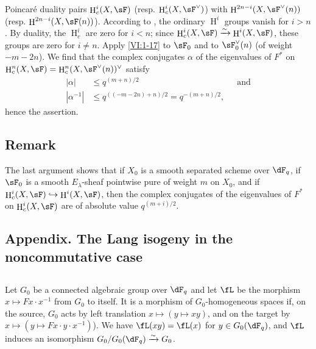 \documentclass[oneside]{book}
\DeclareMathOperator{\h}{H}
\newcommand{\iso}{\xrightarrow\sim}
\theoremstyle{sga-source}
\theoremstyle{sga-source-dash}
\theoremstyle{sga-source-dotdash}
\theoremstyle{sga-source-number-note-dash}
\theoremstyle{sga-source-note-number-dotdash}
\theoremstyle{sga-source-example-dotdash}
\theoremstyle{sga-source-inline-number}
\theoremstyle{sga-source-bare-number}
\theoremstyle{sga-source}
\newcommand{\PrintPage}[1]{}\newcommand{\MathPage}[1]{}\newcommand{\PrintCite}[2]{#1}\newcommand{\var}[3]{#2}
\begin{document}
Poincaré duality pairs $\h_c^i(X,\sF)$ (resp. 
$\h_c^i(X,\sF^\vee)$) with $\h^{2n-i}(X,\sF^\vee(n))$ (resp. 
$\h^{2n-i}(X,\sF(n))$). According to \cite[XIV 3.2]{sga4}, the ordinary $\h^i$ groups 
vanish for $i>n$. By duality, the $\h_c^i$ are zero for $i<n$; since 
$\h_c^i(X,\sF) \iso \h^i(X,\sF)$, these groups are zero for $i\ne n$. 
\var{Apply \ref{VI:1-15}}{Apply \ref{VI:1-17}}{S45-SOL-0722} to $\sF_0$ and to $\sF_0^\vee(n)$ (of weight 
$-m-2n$). We find that the complex conjugates $\alpha$ of the eigenvalues 
of $F^\ast$ on $\h_c^n(X,\sF) = \h_c^n(X,\sF^\vee(n))^\vee$ satisfy 
\begin{align*}
  |\alpha| &\leqslant q^{(m+n)/2} && \text{and} \\
  |\alpha^{-1}| &\leqslant q^{((-m-2n)+n)/2} = q^{-(m+n)/2} \text{,}
\end{align*}
hence the assertion. 





\subsection{Remark}\label{VI:1-21}

The last argument shows that if $X_0$ is a smooth separated scheme over 
$\dF_q$, if $\sF_0$ is a smooth $E_\lambda$-sheaf pointwise pure of weight 
$m$ on $X_0$, and if $\h_c^i(X,\sF) \hookrightarrow \h^i(X,\sF)$, then the 
complex conjugates of the eigenvalues of $F^\ast$ on $\h_c^i(X,\sF)$ are 
of absolute value $q^{(m+i)/2}$. 





\PrintPage{181}
\subsection*{Appendix. The Lang isogeny in the noncommutative case}




\subsection{}\label{VI:1-22}

Let $G_0$ be a connected algebraic group over $\dF_q$ and let $\fL$ be the morphism 
$x\mapsto F x\cdot x^{-1}$ from $G_0$ to itself. It is a morphism of 
$G_0$-homogeneous spaces if, on the source, $G_0$ acts by left translation 
$x\mapsto (y\mapsto x y)$, and on the target by 
$x\mapsto (y\mapsto F x\cdot y\cdot x^{-1})$). We have $\fL(xy) = \fL(x)$ for 
$y\in G_0(\dF_q)$, and $\fL$ induces an isomorphism $G_0/G_0(\dF_q)\iso G_0$. 
\end{document}
